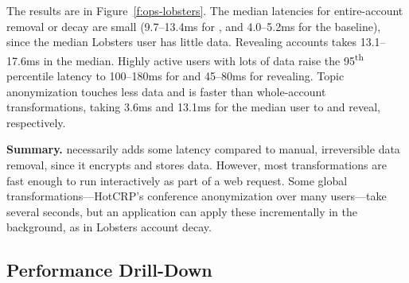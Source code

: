 %
The results are in Figure~\ref{f:ops-lobsters}.
%
The median latencies for entire-account removal or decay are small (9.7--13.4ms
for \sys, and 4.0--5.2ms for the baseline), since the median Lobsters user has
little data. Revealing \xxed accounts takes 13.1--17.6ms in the median.
%
Highly active users with lots of data raise the 95\textsuperscript{th} percentile
latency to 100--180ms for \xxing and 45--80ms for revealing.
%
Topic anonymization touches less data and is faster than
whole-account transformations, taking 3.6ms and 13.1ms for the median user to
\xx and reveal, respectively.
%

\textbf{Summary.}
%
\sys necessarily adds some latency compared to manual, irreversible data
removal, since it encrypts and stores \xxed data.
%
However, most \xxing transformations are fast enough to run interactively as
part of a web request.
%
Some global \xxing transformations---\eg HotCRP's conference anonymization over
many users---take several seconds, but an application can apply these
incrementally in the background, as in Lobsters account decay.
%

\subsection{\sys Performance Drill-Down}
\label{s:eval-additional}

